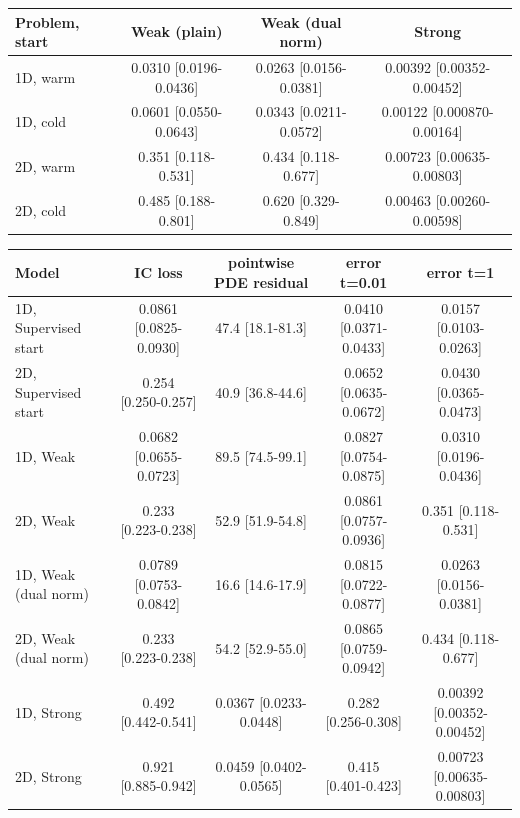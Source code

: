 \begin{tabular}{lccc}
\toprule
Problem, start & Weak (plain) & Weak (dual norm) & Strong \\
\midrule
1D, warm & 0.0310 {\scriptsize[0.0196-0.0436]} & 0.0263 {\scriptsize[0.0156-0.0381]} & 0.00392 {\scriptsize[0.00352-0.00452]} \\
1D, cold & 0.0601 {\scriptsize[0.0550-0.0643]} & 0.0343 {\scriptsize[0.0211-0.0572]} & 0.00122 {\scriptsize[0.000870-0.00164]} \\
2D, warm & 0.351 {\scriptsize[0.118-0.531]} & 0.434 {\scriptsize[0.118-0.677]} & 0.00723 {\scriptsize[0.00635-0.00803]} \\
2D, cold & 0.485 {\scriptsize[0.188-0.801]} & 0.620 {\scriptsize[0.329-0.849]} & 0.00463 {\scriptsize[0.00260-0.00598]} \\
\bottomrule
\end{tabular}

\begin{tabular}{lcccc}
\toprule
Model & IC loss & pointwise PDE residual & error t=0.01 & error t=1 \\
\midrule
1D, Supervised start & 0.0861 {\scriptsize[0.0825-0.0930]} & 47.4 {\scriptsize[18.1-81.3]} & 0.0410 {\scriptsize[0.0371-0.0433]} & 0.0157 {\scriptsize[0.0103-0.0263]} \\
2D, Supervised start & 0.254 {\scriptsize[0.250-0.257]} & 40.9 {\scriptsize[36.8-44.6]} & 0.0652 {\scriptsize[0.0635-0.0672]} & 0.0430 {\scriptsize[0.0365-0.0473]} \\
1D, Weak & 0.0682 {\scriptsize[0.0655-0.0723]} & 89.5 {\scriptsize[74.5-99.1]} & 0.0827 {\scriptsize[0.0754-0.0875]} & 0.0310 {\scriptsize[0.0196-0.0436]} \\
2D, Weak & 0.233 {\scriptsize[0.223-0.238]} & 52.9 {\scriptsize[51.9-54.8]} & 0.0861 {\scriptsize[0.0757-0.0936]} & 0.351 {\scriptsize[0.118-0.531]} \\
1D, Weak (dual norm) & 0.0789 {\scriptsize[0.0753-0.0842]} & 16.6 {\scriptsize[14.6-17.9]} & 0.0815 {\scriptsize[0.0722-0.0877]} & 0.0263 {\scriptsize[0.0156-0.0381]} \\
2D, Weak (dual norm) & 0.233 {\scriptsize[0.223-0.238]} & 54.2 {\scriptsize[52.9-55.0]} & 0.0865 {\scriptsize[0.0759-0.0942]} & 0.434 {\scriptsize[0.118-0.677]} \\
1D, Strong & 0.492 {\scriptsize[0.442-0.541]} & 0.0367 {\scriptsize[0.0233-0.0448]} & 0.282 {\scriptsize[0.256-0.308]} & 0.00392 {\scriptsize[0.00352-0.00452]} \\
2D, Strong & 0.921 {\scriptsize[0.885-0.942]} & 0.0459 {\scriptsize[0.0402-0.0565]} & 0.415 {\scriptsize[0.401-0.423]} & 0.00723 {\scriptsize[0.00635-0.00803]} \\
\bottomrule
\end{tabular}

